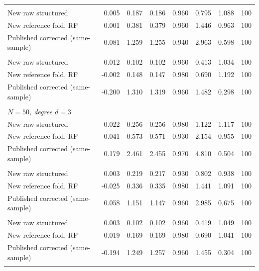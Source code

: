 {\begin{longtable}{lrrrrrrr}
\addlinespace
\multicolumn{8}{l}{\textit{$N=100$, degree $d=2$}} \\
\quad New raw structured & 0.005 & 0.187 & 0.186 & 0.960 & 0.795 & 1.088 & 100 \\
\quad New reference fold, RF & 0.001 & 0.381 & 0.379 & 0.960 & 1.446 & 0.963 & 100 \\
\quad Published corrected (same-sample) & 0.081 & 1.259 & 1.255 & 0.940 & 2.963 & 0.598 & 100 \\
\addlinespace
\multicolumn{8}{l}{\textit{$N=400$, degree $d=2$}} \\
\quad New raw structured & 0.012 & 0.102 & 0.102 & 0.960 & 0.413 & 1.034 & 100 \\
\quad New reference fold, RF & -0.002 & 0.148 & 0.147 & 0.980 & 0.690 & 1.192 & 100 \\
\quad Published corrected (same-sample) & -0.200 & 1.310 & 1.319 & 0.960 & 1.482 & 0.298 & 100 \\
\addlinespace
\multicolumn{8}{l}{\textit{baseline\_sweep\_d3}} \\
\multicolumn{8}{l}{\textit{$N=50$, degree $d=3$}} \\
\quad New raw structured & 0.022 & 0.256 & 0.256 & 0.980 & 1.122 & 1.117 & 100 \\
\quad New reference fold, RF & 0.041 & 0.573 & 0.571 & 0.930 & 2.154 & 0.955 & 100 \\
\quad Published corrected (same-sample) & 0.179 & 2.461 & 2.455 & 0.970 & 4.810 & 0.504 & 100 \\
\addlinespace
\multicolumn{8}{l}{\textit{$N=100$, degree $d=3$}} \\
\quad New raw structured & 0.003 & 0.219 & 0.217 & 0.930 & 0.802 & 0.938 & 100 \\
\quad New reference fold, RF & -0.025 & 0.336 & 0.335 & 0.980 & 1.441 & 1.091 & 100 \\
\quad Published corrected (same-sample) & 0.058 & 1.151 & 1.147 & 0.960 & 2.985 & 0.675 & 100 \\
\addlinespace
\multicolumn{8}{l}{\textit{$N=400$, degree $d=3$}} \\
\quad New raw structured & 0.003 & 0.102 & 0.102 & 0.960 & 0.419 & 1.049 & 100 \\
\quad New reference fold, RF & 0.019 & 0.169 & 0.169 & 0.980 & 0.690 & 1.041 & 100 \\
\quad Published corrected (same-sample) & -0.194 & 1.249 & 1.257 & 0.960 & 1.455 & 0.304 & 100 \\
\addlinespace
\multicolumn{8}{l}{\textit{$N=800$, degree $d=3$}} \\

\end{longtable}}
